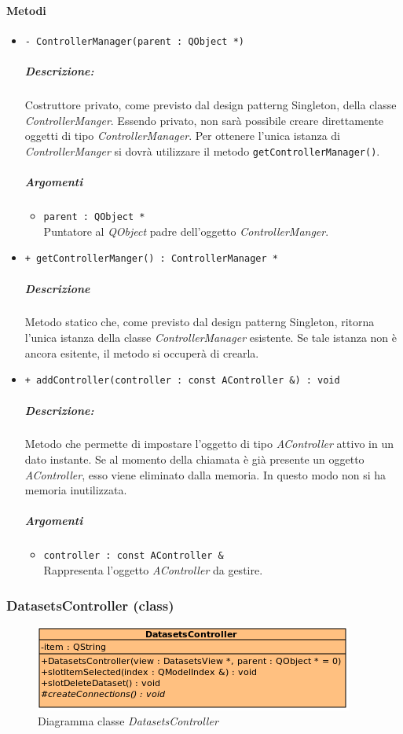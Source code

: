 	\paragraph{\color{black}Metodi}
		\begin{itemize}
			\item \color{blue} \verb!- ControllerManager(parent : QObject *)!
			\color{black}
			\subparagraph{Descrizione:} Costruttore privato, come previsto dal design patterng\g{} Singleton, della classe \textsl{ControllerManger}. Essendo privato, non sarà possibile creare direttamente oggetti di tipo \textsl{ControllerManager}. Per ottenere l'unica istanza di \textsl{ControllerManger} si dovrà utilizzare il metodo \verb!getControllerManager()!.
			\color{black}
			\subparagraph{Argomenti}
			\begin{itemize}
				\item \color{RoyalPurple} \verb!parent : QObject *!\\				
\color{black} Puntatore al \textsl{QObject} padre dell'oggetto \textsl{ControllerManger}.
			\end{itemize}
			\item \color{blue} \verb!+ getControllerManger() : ControllerManager *!
			\color{black}
			\subparagraph{Descrizione} Metodo statico che, come previsto dal design patterng\g{} Singleton, ritorna l'unica istanza della classe \textsl{ControllerManager} esistente. Se tale istanza non è ancora esitente, il metodo si occuperà di crearla.
			\item \color{blue} \verb!+ addController(controller : const AController &) : void!
			\color{black}
			\subparagraph{Descrizione:} Metodo che permette di impostare l'oggetto di tipo \textsl{AController} attivo in un dato instante. Se al momento della chiamata è già presente un oggetto \textsl{AController}, esso viene eliminato dalla memoria. In questo modo non si ha memoria inutilizzata.
			\color{black}
			\subparagraph{Argomenti}
			\begin{itemize}
				\item \color{RoyalPurple} \verb!controller : const AController &!\\				
\color{black} Rappresenta l'oggetto \textsl{AController} da gestire.
			\end{itemize}
		\end{itemize}
		\pagebreak
	\subsubsection{DatasetsController (class)}
	\begin{figure}[!h]
		\centering
		\includegraphics[width=0.6\linewidth]{./Content/Immagini/controller/DatasetsController}
		\caption{Diagramma classe \textsl{DatasetsController}}
	\end{figure}
